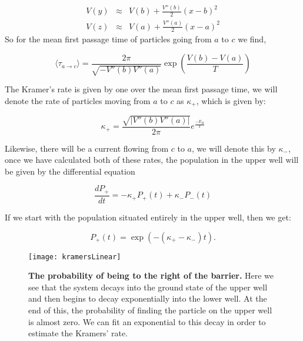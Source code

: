 \begin{eqnarray}
V(y) &\approx& V(b) + \frac{V''(b)}{2}(x - b)^2 \\
V(z) &\approx& V(a) + \frac{V''(a)}{2}(x - a)^2 
\end{eqnarray}
So for the mean first passage time of particles going from $a$ to $c$ we find,

\begin{equation}
\langle \tau_{a \to c} \rangle = \frac{2 \pi}{\sqrt{-V''(b) V''(a)}} \exp{\left (\frac{V(b) - V(a)}{T} \right)}  \label{eqn:kramersRate}
\end{equation}


The Kramer's rate is given by one over the mean first passage time, we will denote the rate of particles moving from $a$ to $c$ as $\kappa_+$, which is given by:

\begin{equation}
\kappa_+ = \frac{\sqrt{|V''(b) V''(a) |}}{2 \pi} e^\frac{-E_B}{T}
\end{equation}


Likewise, there will be a current flowing from $c$ to $a$, we will denote this by $\kappa_-$, once we have calculated both of these rates, the population in the upper well will be given by the differential equation

\begin{equation}
\frac{d P_+}{dt} = -\kappa_+ P_+(t) + \kappa_- P_-(t)
\end{equation}

If we start with the population situated entirely in the upper well, then we get:

\begin{equation}
P_+(t) = \exp{(-(\kappa_+ - \kappa_- )t)}.
\end{equation}

\begin{figure}
	\center
	\texttt{[image: kramersLinear]}
	\caption{\textbf{The probability of being to the right of the barrier.} Here we see that the system decays into the ground state of the upper well and then begins to decay exponentially into the lower well. At the end of this, the probability of finding the particle on the upper well is almost zero. We can fit an exponential to this decay in order to estimate the Kramers' rate. \label{fig:kramersLinear}}
\end{figure}

